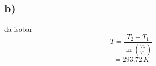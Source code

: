 

\subsection*{b)}
da isobar
\[
\overline{T} = \frac{T_2 - T_1}{\ln(\frac{T_2}{T_1})}
\]
\[
= \boxed{293.72 \, K}
\]